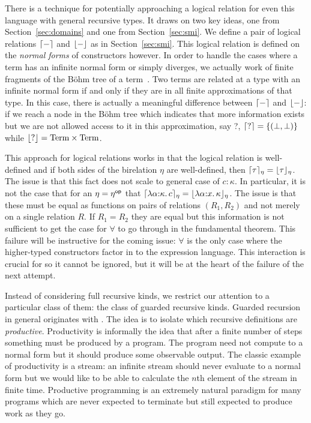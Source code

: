 There is a technique for potentially approaching a logical relation
for even this language with general recursive types. It draws on two
key ideas, one from Section~\ref{sec:domains} and one from
Section~\ref{sec:smi}. We define a pair of logical relations
$\lceil - \rceil$ and $\lfloor - \rfloor$ as in Section~\ref{sec:smi}. This
logical relation is defined on the \emph{normal forms} of
constructors however. In order to handle the cases where a term has an
infinite normal form or simply diverges, we actually work of finite
fragments of the B\"ohm tree of a term~\citep{Barendregt:13}. Two terms
are related at a type with an infinite normal form if and only if they
are in all finite approximations of that type. In this case, there is
actually a meaningful difference between $\lceil - \rceil$ and
$\lfloor - \rfloor$: if we reach a node in the B\"ohm tree which indicates
that more information exists but we are not allowed access to it in
this approximation, say ?, $\lceil ? \rceil = \{(\bot, \bot)\}$ while
$\lfloor ? \rfloor = \mathrm{Term} \times \mathrm{Term}$.

This approach for logical relations works in that the logical relation
is well-defined and if both sides of the birelation $\eta$ are
well-defined, then $\lceil \tau \rceil_\eta =
\lfloor \tau \rfloor_\eta$. The issue is that this fact does not scale to
general case of $c : \kappa$. In particular, it is not the case that
for an $\eta = \eta^{\mathsf{op}}$ that
$\lceil \lambda \alpha {:} \kappa.\, c \rceil_\eta = \lfloor \lambda \alpha {:} x.\, \kappa \rfloor_\eta$.
The issue is that these must be equal as functions on pairs of
relations $(R_1, R_2)$ and not merely on a single relation $R$. If
$R_1 = R_2$ they are equal but this information is not sufficient to
get the case for $\forall$ to go through in the fundamental
theorem. This failure will be instructive for the coming issue:
$\forall$ is the only case where the higher-typed constructors factor
in to the expression language. This interaction is crucial for
\citet{Pottier:11} so it cannot be ignored, but it will be at the
heart of the failure of the next attempt.

Instead of considering full recursive kinds, we restrict our attention
to a particular class of them: the class of guarded recursive
kinds. Guarded recursion in general originates with
\citet{Nakano:00}. The idea is to isolate which recursive
definitions are \emph{productive}. Productivity is informally the idea
that after a finite number of steps something must be produced by a
program. The program need not compute to a normal form but it should
produce some observable output. The classic example of productivity is
a stream: an infinite stream should never evaluate to a normal form
but we would like to be able to calculate the $n$th element of the
stream in finite time. Productive programming is an extremely natural
paradigm for many programs which are never expected to terminate but
still expected to produce work as they go.

